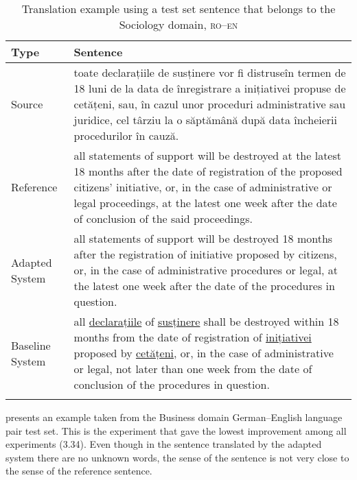 \documentclass[output=paper]{LSP/langsci}
\begin{document}
\begin{table}
 \begin{tabularx}{\textwidth}{lX}
\lsptoprule
{Type} &{Sentence}\\
\midrule
Source & toate declarațiile de susținere vor fi distruseîn termen de 18 luni de la  data de înregistrare a inițiativei propuse de cetățeni, sau, în cazul unor proceduri administrative sau juridice, cel târziu la o săptămână  după data încheierii procedurilor în cauză.\\
Reference & all statements of support will be destroyed at the latest 18 months after the date of registration of the proposed citizens' initiative, or, in the case of administrative or legal proceedings, at the latest one week after the date of conclusion of the said proceedings.\\
Adapted System & all statements of support will be destroyed 18 months after the registration of initiative proposed by citizens, or, in the case of administrative procedures or legal, at the latest one week after the date of the procedures in question.\\
Baseline System & all \underline{declarațiile} of \underline{susținere} shall be destroyed within 18 months from the date of registration of \underline{inițiativei} proposed by \underline{cetățeni}, or, in the case of administrative or legal, not later than one week from the date of conclusion of the procedures in question.\\
 \lspbottomrule
 \end{tabularx}
\caption{Translation example using a test set sentence that belongs to the Sociology domain, \textsc{ro--en}}
\label{tab:dumavertan:7}
\end{table}

 presents an example taken from the Business domain German–English language pair test set. This is the experiment that gave the lowest improvement among all experiments (3.34). Even though in the sentence translated by the adapted system there are no unknown words, the sense of the sentence is not very close to the sense of the reference sentence.
\end{document}
